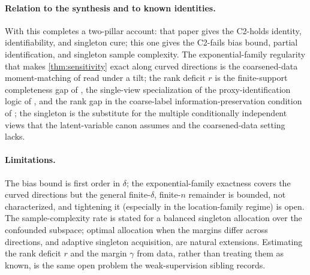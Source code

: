 \paragraph{Relation to the synthesis and to known identities.} With
\citet{towell2026synthesis} this completes a two-pillar account: that paper gives
the C2-holds identity, identifiability, and singleton cure; this one gives the
C2-fails bias bound, partial identification, and singleton sample complexity. The
exponential-family regularity that makes \cref{thm:sensitivity} exact along curved
directions is the coarsened-data moment-matching of \citet{domke2020moment} read
under a tilt; the rank deficit $r$ is the finite-support completeness gap of
\citet{neweypowell2003instrumental}, the single-view specialization of the
proxy-identification logic of \citet{miao2018identifying}, and the rank gap in the
coarse-label information-preservation condition of \citet{fotakis2021efficient}; the
singleton is the substitute for the multiple conditionally independent views that the
latent-variable canon assumes and the coarsened-data setting lacks.

\paragraph{Limitations.} The bias bound is first order in $\delta$; the
exponential-family exactness covers the curved directions but the general
finite-$\delta$, finite-$n$ remainder is bounded, not characterized, and tightening
it (especially in the location-family regime) is open. The sample-complexity rate is
stated for a balanced singleton allocation over the confounded subspace; optimal
allocation when the margins differ across directions, and adaptive singleton
acquisition, are natural extensions. Estimating the rank deficit $r$ and the margin
$\gamma$ from data, rather than treating them as known, is the same open problem the
weak-supervision sibling records.
